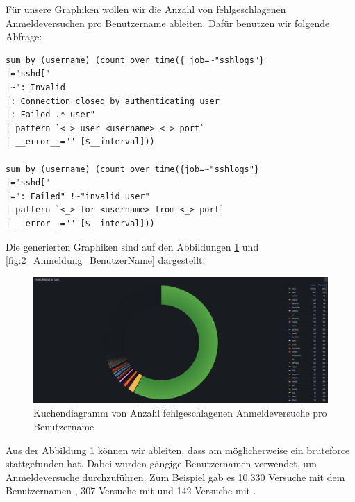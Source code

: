 Für unsere Graphiken wollen wir die Anzahl von fehlgeschlagenen Anmeldeversuchen pro Benutzername ableiten. Dafür benutzen wir folgende Abfrage: 

{
\begin{Verbatim}[frame=single]
sum by (username) (count_over_time({ job=~"sshlogs"} 
|="sshd[" 
|~": Invalid
|: Connection closed by authenticating user
|: Failed .* user" 
| pattern `<_> user <username> <_> port` 
| __error__="" [$__interval]))

sum by (username) (count_over_time({job=~"sshlogs"}
|="sshd[" 
|=": Failed" !~"invalid user" 
| pattern `<_> for <username> from <_> port` 
| __error__="" [$__interval]))
\end{Verbatim}
}

Die generierten Graphiken sind auf den Abbildungen \ref{fig:1_Anmeldung_BenutzerName} und \ref{fig:2_Anmeldung_BenutzerName} dargestellt:

\newpage
{}
\thispagestyle{lscape}
\begin{landscape}
    \begin{figure}[H]
        \centerline{\includegraphics[width=1.7\textwidth]{assets/Failed_pro_user.png}}
        \caption[Kuchendiagramm von Anzahl fehlgeschlagenen Anmeldeversuche pro Benutzername]
        {Kuchendiagramm von Anzahl fehlgeschlagenen Anmeldeversuche pro Benutzername}
        \label{fig:1_Anmeldung_BenutzerName}
        \centering
    \end{figure}
Aus der Abbildung \ref{fig:1_Anmeldung_BenutzerName} können wir ableiten, dass am  möglicherweise ein \gls{bruteforce} stattgefunden hat. Dabei wurden gängige Benutzernamen verwendet, um Anmeldeversuche durchzuführen. Zum Beispiel gab es 10.330 Versuche mit dem Benutzernamen , 307 Versuche mit  und 142 Versuche mit .
\end{landscape}
\restoregeometry

